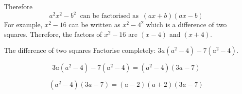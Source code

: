 Therefore
\begin{equation*}
{a}^{2}{x}^{2}-{b}^{2}~\mbox{ can be factorised as }~(ax+b)(ax-b)
\end{equation*}
For example, ${x}^{2}-16$ can be written as ${x}^{2}-{4}^{2}$ which is a difference of two squares. 
Therefore, the factors of ${x}^{2}-16$ are $(x-4)$ and $(x+4)$.





\begin{wex}{The difference of two squares}
{Factorise completely: $3a(a^2-4)-7(a^2-4)$.}
{


\begin{equation*}
  3a(a^2-4)-7(a^2-4) = (a^2-4)(3a-7)
\end{equation*}

$$
(a^2-4)(3a-7) = (a-2)(a+2)(3a-7)
$$
}
\end{wex}


